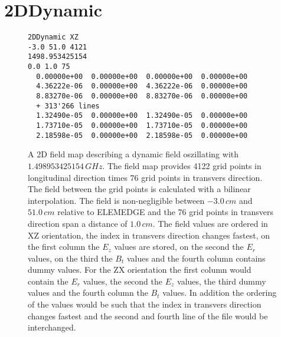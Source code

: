 \section{2DDynamic}
\label{sec:2DDynamic}
\begin{figure}[h]
\label{fig:2DDynamic}
\begin{fmpage}
\begin{verbatim}
2DDynamic XZ
-3.0 51.0 4121
1498.953425154
0.0 1.0 75
  0.00000e+00  0.00000e+00  0.00000e+00  0.00000e+00
  4.36222e-06  0.00000e+00  4.36222e-06  0.00000e+00
  8.83270e-06  0.00000e+00  8.83270e-06  0.00000e+00
  + 313'266 lines
  1.32490e-05  0.00000e+00  1.32490e-05  0.00000e+00
  1.73710e-05  0.00000e+00  1.73710e-05  0.00000e+00
  2.18598e-05  0.00000e+00  2.18598e-05  0.00000e+00
\end{verbatim}
\end{fmpage}
\caption[Example of a 2DDynamic field map]{A 2D field map describing a dynamic field oszillating with $1.498953425154\,GHz$. The field map provides 4122 grid points in longitudinal direction times 76 grid points in transvers direction. The field between the grid points is calculated with a bilinear interpolation. The field is non-negligible between $-3.0\,cm$ and $51.0\,cm$ relative to ELEMEDGE and the 76 grid points in transvers direction span a distance of $1.0\,cm$. The field values are ordered in XZ orientation, the index in transvers direction changes fastest, on the first column the $E_z$ values are stored, on the second the $E_r$ values, on the third the $B_t$ values and the fourth column contains dummy values. For the ZX orientation the first column would contain the $E_r$ values, the second the $E_z$ values, the third dummy values and the fourth column the $B_t$ values. In addition the ordering of the values would be such that the index in transvers direction changes fastest and the second and fourth line of the file would be interchanged.}
\end{figure}
\clearpage

